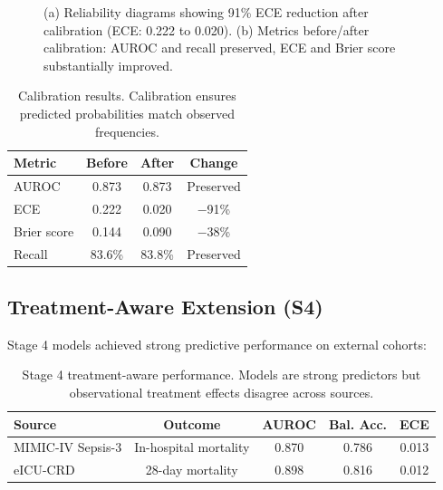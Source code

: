 \documentclass[11pt,a4paper]{article}
\begin{document}
\begin{figure}[htbp]
\caption{(a) Reliability diagrams showing 91\% ECE reduction after calibration (ECE: 0.222 to 0.020). (b) Metrics before/after calibration: AUROC and recall preserved, ECE and Brier score substantially improved.}
\label{fig:s35}
\end{figure}

\begin{table}[htbp]
\centering
\caption{Calibration results. Calibration ensures predicted probabilities match observed frequencies.}
\label{tab:cal}
\small
\begin{tabular}{lccc}
\toprule
\textbf{Metric} & \textbf{Before} & \textbf{After} & \textbf{Change} \\
\midrule
AUROC & 0.873 & 0.873 & Preserved \\
ECE & 0.222 & 0.020 & $-$91\% \\
Brier score & 0.144 & 0.090 & $-$38\% \\
Recall & 83.6\% & 83.8\% & Preserved \\
\bottomrule
\end{tabular}
\end{table}

\FloatBarrier

\subsection{Treatment-Aware Extension (S4)}

Stage 4 models achieved strong predictive performance on external cohorts:

\begin{table}[htbp]
\centering
\caption{Stage 4 treatment-aware performance. Models are strong predictors but observational treatment effects disagree across sources.}
\label{tab:s4}
\small
\begin{tabular}{lcccc}
\toprule
\textbf{Source} & \textbf{Outcome} & \textbf{AUROC} & \textbf{Bal. Acc.} & \textbf{ECE} \\
\midrule
MIMIC-IV Sepsis-3 & In-hospital mortality & 0.870 & 0.786 & 0.013 \\
eICU-CRD & 28-day mortality & 0.898 & 0.816 & 0.012 \\
\bottomrule
\end{tabular}
\end{table}
\end{document}
